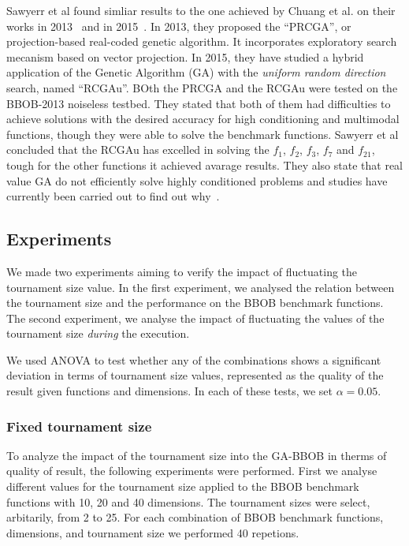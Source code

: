 Sawyerr et al found simliar results to the one achieved by Chuang et al. on their works in 2013~\cite{sawyerr2013benchmarking} and in 2015~\cite{sawyerr2015benchmarking}. In 2013, they proposed the ``PRCGA'', or projection-based real-coded genetic algorithm. It incorporates exploratory search mecanism based on vector projection. In 2015, they have studied a hybrid application of the Genetic Algorithm (GA) with the \textit{uniform random direction} search, named ``RCGAu''. BOth the PRCGA and the RCGAu were tested on the BBOB-2013 noiseless testbed. They stated that both of them had difficulties to achieve solutions with the desired accuracy for high conditioning and multimodal functions, though they were able to solve the benchmark functions.  Sawyerr et al concluded that the RCGAu has excelled in solving the $f_1$, $f_2$, $f_3$, $f_7$ and $f_{21}$, tough for the other functions it achieved avarage results. They also state that real value GA do not efficiently solve highly conditioned problems and studies have currently been carried out to find out why~\cite{sawyerr2015benchmarking}.




\label{sec:experiment}

\subsection{Experiments}
We made two experiments aiming to verify the impact of fluctuating the tournament size value. In the first experiment, we analysed the relation between the tournament size and the performance on the BBOB benchmark functions. The second experiment, we analyse the impact of fluctuating the values of the tournament size \textit{during} the execution.

We used ANOVA to test whether any of the combinations shows a
significant deviation in terms of tournament size values, represented as the
quality of the result given functions and dimensions. In each of these tests, we set
$\alpha = 0.05$.

\subsubsection*{Fixed tournament size}

To analyze the impact of the tournament size into the GA-BBOB in therms of quality of result, the following experiments were performed. First we analyse different values for the tournament size applied to the BBOB benchmark functions with 10, 20 and 40 dimensions. The tournament sizes were select, arbitarily, from 2 to 25. For each combination of BBOB benchmark functions, dimensions, and tournament size we performed 40 repetions.


